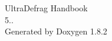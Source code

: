 \documentclass{book}
\begin{document}
\hypersetup{pageanchor=false,citecolor=blue}
\begin{titlepage}
\vspace*{7cm}
\begin{center}
{\Large Ultra\-Defrag Handbook \\[1ex]\large 5.. }\\
\vspace*{1cm}
{\large Generated by Doxygen 1.8.2}\\
\end{center}
\end{titlepage}
\clearemptydoublepage
{}
\hypersetup{pageanchor=true,citecolor=blue}
\end{document}
